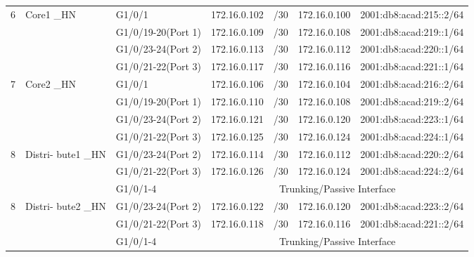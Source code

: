 \documentclass[12pt,a4paper]{report}
\begin{document}
\begin{center}
\begin{longtable}{|p{}|p{}|p{}|p{}|p{}|p{}|p{}|}
\hline  \multirow{4}{*}{6}  &  Core1 \_HN  &  G1/0/1  &  172.16.0.102  &  /30  &  172.16.0.100  &  2001:db8:acad:215::2/64  \\\cline{3-7}
&    &  G1/0/19-20(Port 1)  &  172.16.0.109  &  /30  &  172.16.0.108  &  2001:db8:acad:219::1/64 \\\cline{3-7}
&    &  G1/0/23-24(Port 2)  &  172.16.0.113  &  /30  &  172.16.0.112  &  2001:db8:acad:220::1/64 \\\cline{3-7}
&    &  G1/0/21-22(Port 3)  &  172.16.0.117  &  /30  &  172.16.0.116  &  2001:db8:acad:221::1/64 \\\cline{3-7}

\hline  \multirow{4}{*}{7}  &  Core2 \_HN  &  G1/0/1  &  172.16.0.106  &  /30  &  172.16.0.104  &  2001:db8:acad:216::2/64 \\\cline{3-7}
&     &  G1/0/19-20(Port 1)  &  172.16.0.110  &  /30  &  172.16.0.108  &  2001:db8:acad:219::2/64 \\\cline{3-7}
&     &  G1/0/23-24(Port 2)  &  172.16.0.121  &  /30  &  172.16.0.120  &  2001:db8:acad:223::1/64 \\\cline{3-7}
&    &  G1/0/21-22(Port 3)  &  172.16.0.125  &  /30  &  172.16.0.124  &  2001:db8:acad:224::1/64 \\\cline{3-7}

\hline  \multirow{3}{*}{8}  &  Distri- bute1 \_HN  &  G1/0/23-24(Port 2)  &  172.16.0.114  &  /30  &  172.16.0.112  &  2001:db8:acad:220::2/64\\\cline{3-7}
&    &  G1/0/21-22(Port 3)  &  172.16.0.126  &  /30  &  172.16.0.124  &  2001:db8:acad:224::2/64 \\\cline{3-7}
&    &  G1/0/1-4   &    \multicolumn{4}{|c|}{Trunking/Passive Interface} \\\cline{3-7}

\hline  \multirow{3}{*}{8}  &  Distri- bute2 \_HN  &  G1/0/23-24(Port 2)  &  172.16.0.122  &  /30  &  172.16.0.120  &  2001:db8:acad:223::2/64 \\\cline{3-7}
&     &  G1/0/21-22(Port 3)  &  172.16.0.118  &  /30  &  172.16.0.116  &  2001:db8:acad:221::2/64 \\\cline{3-7}
&     &  G1/0/1-4  &    \multicolumn{4}{|c|}{Trunking/Passive Interface} \\\cline{3-7}


\end{longtable}
\end{center}
\end{document}
